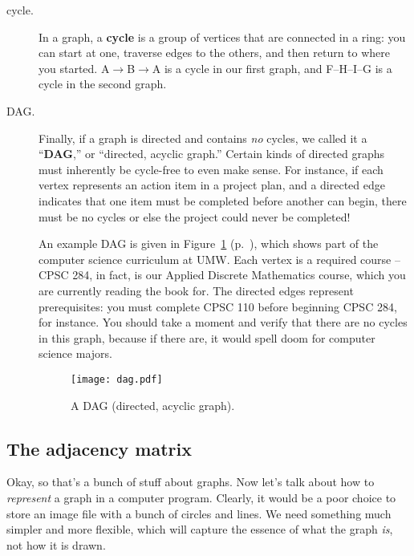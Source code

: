 \begin{description}

\item[cycle.] In a graph, a \textbf{cycle} is a group of vertices that are
connected in a ring: you can start at one, traverse edges to the others, and
then return to where you started. A$\rightarrow$B$\rightarrow$A is a cycle in
our first graph, and F--H--I--G is a cycle in the second graph.


\item[DAG.] Finally, if a graph is directed and contains \textit{no} cycles, we
called it a ``\textbf{DAG},'' or ``directed, acyclic graph.'' Certain kinds of
directed graphs must inherently be cycle-free to even make sense. For instance,
if each vertex represents an action item in a project plan, and a directed edge
indicates that one item must be completed before another can begin, there must
be no cycles or else the project could never be completed!


An example DAG is given in Figure~\ref{fig:dag} (p.~\pageref{fig:dag}), which
shows part of the computer science curriculum at UMW. Each vertex is a required
course -- CPSC 284, in fact, is our Applied Discrete Mathematics course, which
you are currently reading the book for. The directed edges represent
prerequisites: you must complete CPSC 110 before beginning CPSC 284, for
instance. You should take a moment and verify that there are no cycles in this
graph, because if there are, it would spell doom for computer science majors.

\begin{figure}[ht]
\centering
\texttt{[image: dag.pdf]}
\caption{A DAG (directed, acyclic graph).}
\label{fig:dag}
\end{figure}

\end{description}

\subsection{The adjacency matrix}

Okay, so that's a bunch of stuff about graphs. Now let's talk about how to
\textit{represent} a graph in a computer program. Clearly, it would be a poor
choice to store an image file with a bunch of circles and lines. We need
something much simpler and more flexible, which will capture the essence of
what the graph \textit{is}, not how it is drawn.

